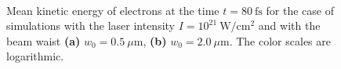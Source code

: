 \begin{figure}[h!]
	\label{fig:21}
\end{figure}

\begin{figure}[h!]
	\centering
	\\[2mm]
	\caption{Mean kinetic energy of electrons at the time $ t = 80 \ \mathrm{fs} $ for the case of simulations with the laser intensity $ I = 10^{21} \ \mathrm{W/cm^2} $ and with the beam waist \textbf{(a)} $ w_0 = 0.5 \ \mu\mathrm{m} $, \textbf{(b)} $ w_0 = 2.0 \ \mu\mathrm{m} $. The color scales are logarithmic.}
	\label{fig:17}
\end{figure}

